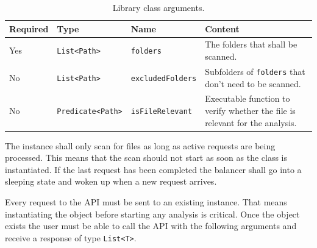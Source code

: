 \documentclass[11pt]{article} %
\begin{document}
    \begin{table}[H]
        \centering
        \begin{tabular}{p{.1\linewidth} | p{.2\linewidth} | p{.2\linewidth} | p{.4\linewidth}}
            \textbf{Required} & \textbf{Type} & \textbf{Name} & \textbf{Content}
            \\\hline
            Yes & \verb|List<Path>| & \verb|folders| & The folders that shall be scanned.
            \\\hline
            No & \verb|List<Path>| & \verb|excludedFolders| &
            Subfolders of
            \verb|folders|\hyperref[fn:1]{\footnotemark[1]} that don't need to be scanned. \\\hline
            No & \verb|Predicate<Path>| & \verb|isFileRelevant| & Executable function to verify whether the file is
            relevant\hyperref[fn:2]{\footnotemark[2]} for the analysis.
        \end{tabular}
        \caption{Library class arguments.}
        \label{tab:lib_args}
    \end{table}
    \label{fn:1}
    \label{fn:2}
    \addtocounter{footnote}{2}

    The instance shall only scan for files as long as active requests are being processed. This means that the scan
    should not start as soon as the class is instantiated. If the last request has been completed the balancer
    shall go into a sleeping state and woken up when a new request arrives.

    Every request to the API must be sent to an existing instance. That means instantiating the object before
    starting any analysis is critical. Once the object exists the user must be able to call the API with the following
    arguments and receive a response of type \verb|List<T>|.
\end{document}
